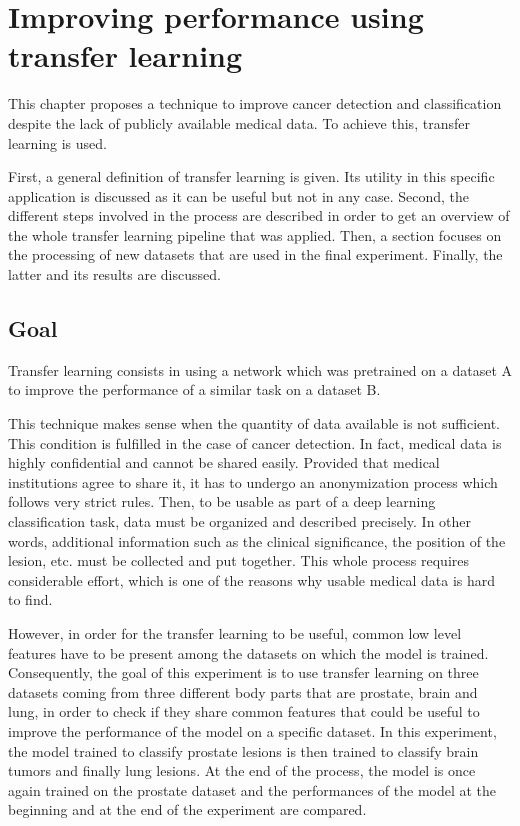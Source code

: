
\chapter{Improving performance using transfer learning}
\label{ch:transfer_learning}
\setlength{\marginparwidth}{3cm}\leavevmode {}This chapter proposes a technique to improve cancer detection and classification despite the lack of publicly available medical data. To achieve this, transfer learning is used.

First, a general definition of transfer learning is given. Its utility in this specific application is discussed as it can be useful but not in any case. Second, the different steps involved in the process are described in order to get an overview of the whole transfer learning pipeline that was applied. Then, a section focuses on the processing of new datasets that are used in the final experiment. Finally, the latter and its results are discussed. 


\section{Goal}
\label{sec:tl_goal}
\setlength{\marginparwidth}{3cm}\leavevmode {}Transfer learning consists in using a network which was pretrained on a dataset A to improve the performance of a similar task on a dataset B.

This technique makes sense when the quantity of data available is not sufficient. This condition is fulfilled in the case of cancer detection. In fact, medical data is highly confidential and cannot be shared easily. Provided that medical institutions agree to share it, it has to undergo an anonymization process which follows very strict rules. Then, to be usable as part of a deep learning classification task, data must be organized and described precisely. In other words, additional information such as the clinical significance, the position of the lesion, etc. must be collected and put together. This whole process requires considerable effort, which is one of the reasons why usable medical data is hard to find.

However, in order for the transfer learning to be useful, common low level features have to be present among the datasets on which the model is trained. Consequently, the goal of this experiment is to use transfer learning on three datasets coming from three different body parts that are prostate, brain and lung, in order to check if they share common features that could be useful to improve the performance of the model on a specific dataset. In this experiment, the model trained to classify prostate lesions is then trained to classify brain tumors and finally lung lesions. At the end of the process, the model is once again trained on the prostate dataset and the performances of the model at the beginning and at the end of the experiment are compared.

